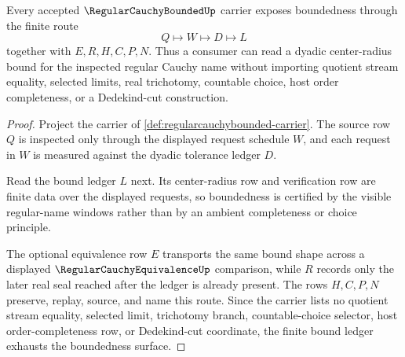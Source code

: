 \begin{theorem}
\label{thm:regularcauchybounded-finite-bound-ledger}
Every accepted $\RegularCauchyBoundedUp$ carrier exposes boundedness through the finite route
$$
Q\longmapsto W\longmapsto D\longmapsto L
$$
together with $E,R,H,C,P,N$. Thus a consumer can read a dyadic center-radius bound for the inspected regular Cauchy name without importing quotient stream equality, selected limits, real trichotomy, countable choice, host order completeness, or a Dedekind-cut construction.
\end{theorem}
\begin{proof}
Project the carrier of \autoref{def:regularcauchybounded-carrier}. The source row $Q$ is inspected only through the displayed request schedule $W$, and each request in $W$ is measured against the dyadic tolerance ledger $D$.

Read the bound ledger $L$ next. Its center-radius row and verification row are finite data over the displayed requests, so boundedness is certified by the visible regular-name windows rather than by an ambient completeness or choice principle.

The optional equivalence row $E$ transports the same bound shape across a displayed $\RegularCauchyEquivalenceUp$ comparison, while $R$ records only the later real seal reached after the ledger is already present. The rows $H,C,P,N$ preserve, replay, source, and name this route. Since the carrier lists no quotient stream equality, selected limit, trichotomy branch, countable-choice selector, host order-completeness row, or Dedekind-cut coordinate, the finite bound ledger exhausts the boundedness surface.
\end{proof}

